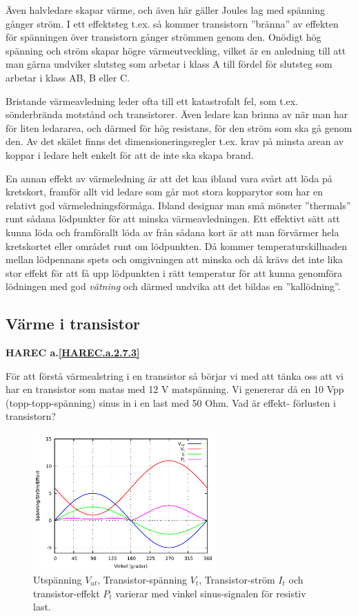 Även halvledare skapar värme, och även här gäller Joules lag med spänning
gånger ström. I ett effektsteg t.ex. så kommer transistorn ''bränna'' av
effekten för spänningen över transistorn gånger strömmen genom den. Onödigt
hög spänning och ström skapar högre värmeutveckling, vilket är en anledning
till att man gärna undviker slutsteg som arbetar i klass A till fördel för
slutsteg som arbetar i klass AB, B eller C.

Bristande värmeavledning leder ofta till ett katastrofalt fel, som t.ex.
sönderbrända motstånd och transistorer. Även ledare kan brinna av när man
har för liten ledararea, och därmed för hög resistans, för den ström som
ska gå genom den. Av det skälet finns det dimensioneringsregler t.ex.
krav på minsta arean av koppar i ledare helt enkelt för att de inte ska
skapa brand.

En annan effekt av värmeledning är att det kan ibland vara svårt att löda
på kretskort, framför allt  vid ledare som går mot stora kopparytor som
har en relativt god värmeledningsförmåga. Ibland designar man små mönster
''thermals'' runt sådana lödpunkter för att minska värmeavledningen.
Ett effektivt sätt att kunna löda och framförallt löda av från sådana
kort är att man förvärmer hela kretskortet eller området runt om
lödpunkten. Då kommer temperaturskillnaden mellan lödpennans spets och
omgivningen att minska och då krävs det inte lika stor effekt för att få
upp lödpunkten i rätt temperatur för att kunna genomföra lödningen med god
\emph{vätning} och därmed undvika att det bildas en ''kallödning''.

\subsection{Värme i transistor}
\textbf{
HAREC a.\ref{HAREC.a.2.7.3}\label{myHAREC.a.2.7.3}
}

För att förstå värmealstring i en transistor så börjar vi med att tänka oss
att vi har en transistor som matas med 12 V matspänning. Vi genererar då en
10 Vpp (topp-topp-spänning) sinus in i en last med 50 Ohm. Vad är effekt-
förlusten i transistorn?

\begin{figure}[h]
\begin{center}
\includegraphics[width=7cm]{images/power1}
\caption{Utspänning $V_{ut}$, Transistor-spänning $V_t$, Transistor-ström $I_t$ och transistor-effekt $P_t$ varierar med vinkel sinus-signalen för resistiv last.}
\label{fig:power1}
\end{center}
\end{figure}

